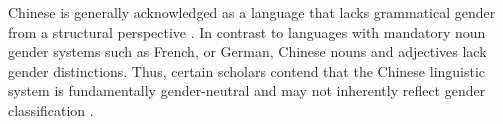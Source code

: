 \documentclass[11pt]{article}
\newcommand{\zh}[1]{\simplifiedchinesefont{#1}\rmfamily}
\begin{document}

Chinese is generally acknowledged as a language that lacks grammatical gender from a structural perspective \citep{li_1989_mandarin}. In contrast to languages with mandatory noun gender systems such as French, or German, Chinese nouns and adjectives lack gender distinctions. Thus, certain scholars contend that the Chinese linguistic system is fundamentally gender-neutral and may not inherently reflect gender classification \citep{li_1989_mandarin,packard_2000_morphology}.
\end{document}
